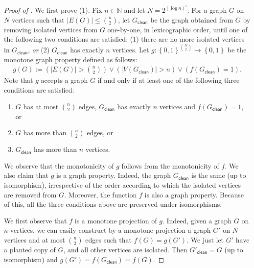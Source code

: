 \documentclass[10pt,a4paper]{article}
\newcommand{\Gclean}[1]{{#1}_{\mathsf{clean}}}
\newcommand{\set}[1]{\left\{#1\right\}}
\newcommand{\card}[1]{\lvert#1\rvert}
\newcommand{\blt}{\set{0,1}}
\def\bbn{{\mathbb N}}
\begin{document}
\begin{proof}[Proof of ]
    We first prove (1). 
    Fix $n \in \bbn$
    and let $N = 2^{(\log n)^i}$.
    For a graph $G$ on $N$
    vertices such that 
    $\card{E(G)} \leq \binom{n}{2}$,
    let
    $\Gclean{G}$ be the graph 
    obtained
    from $G$ by removing isolated vertices from $G$ one-by-one,
    in lexicographic order,
    until one of the following two 
    conditions are satisfied:
    (1) there are no more isolated vertices in $\Gclean{G}$,
    \emph{or}
    (2) $\Gclean{G}$ has exactly $n$ vertices.
    Let $g : \blt^{\binom{N}{2}} \to \blt$
    be the monotone graph property defined as follows:
    \begin{align*}
        g(G) := 
        \left(
            \card{E(G)} > 
            \binom{n}{2}
        \right)
        \lor
        \left(
            \card{V(\Gclean{G})} > n
        \right)
        \lor
            (f(\Gclean{G}) = 1).
    \end{align*}
    Note that $g$ accepts a graph $G$
    if and only if at least 
    one of the following three conditions are satisfied:
    \begin{enumerate}
        \item 
            $G$ has at most $\binom{n}{2}$ edges,
            $\Gclean{G}$ has exactly $n$ vertices
            and 
            $f(\Gclean{G}) = 1$,
            or
        \item 
            $G$ has more than $\binom{n}{2}$ edges,
            or
        \item 
            $\Gclean{G}$ has more than $n$ vertices.
    \end{enumerate}
    We observe that the monotonicity of $g$ follows from 
    the monotonicity of $f$.
    We also claim that $g$ is a graph property.
    Indeed, the graph $\Gclean{G}$ is the same (up to isomorphism),
    irrespective  of the order according to which the isolated vertices are
    removed from $G$. Moreover, the function $f$ is also a graph property.
    Because of this, all the three conditions above
    are preserved under isomorphisms.

    We first observe that $f$ is a monotone projection of $g$.
    Indeed, given a graph $G$ on $n$ vertices,
    we can easily construct by a monotone
    projection a graph $G'$ on $N$ vertices
    and at most $\binom{n}{2}$ edges
    such that
    $f(G) = g(G')$.
    We just let $G'$ have a planted copy of $G$,
    and all other vertices are isolated.
    Then $\Gclean{G'} = G$ (up to isomorphism)
    and $g(G') = f(\Gclean{G}) = f(G)$.


\end{proof}
\end{document}
